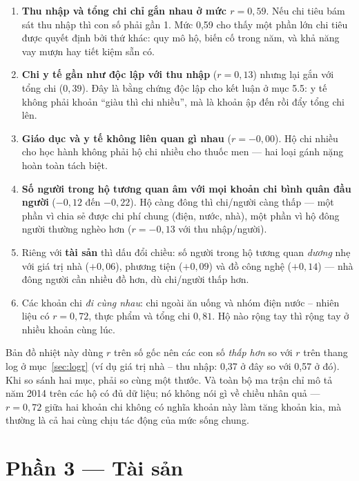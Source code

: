 \documentclass[11pt,a4paper]{article}
\newcommand{\n}[1]{\textbf{#1}}
\begin{document}
\begin{enumerate}[leftmargin=1.4em,itemsep=3pt,topsep=2pt]
\item \n{Thu nhập và tổng chi chỉ gắn nhau ở mức $r = 0{,}59$}. Nếu chi tiêu bám sát thu nhập thì con số phải gần 1. Mức 0,59 cho thấy một phần lớn chi tiêu được quyết định bởi thứ khác: quy mô hộ, biến cố trong năm, và khả năng vay mượn hay tiết kiệm sẵn có.
\item \n{Chi y tế gần như độc lập với thu nhập} ($r = 0{,}13$) nhưng lại gắn với tổng chi ($0{,}39$). Đây là bằng chứng độc lập cho kết luận ở mục 5.5: y tế không phải khoản “giàu thì chi nhiều”, mà là khoản ập đến rồi đẩy tổng chi lên.
\item \n{Giáo dục và y tế không liên quan gì nhau} ($r = -0{,}00$). Hộ chi nhiều cho học hành không phải hộ chi nhiều cho thuốc men — hai loại gánh nặng hoàn toàn tách biệt.
\item \n{Số người trong hộ tương quan âm với mọi khoản chi bình quân đầu người} ($-0{,}12$ đến $-0{,}22$). Hộ càng đông thì chi/người càng thấp — một phần vì chia sẻ được chi phí chung (điện, nước, nhà), một phần vì hộ đông người thường nghèo hơn ($r = -0{,}13$ với thu nhập/người).
\item Riêng với \n{tài sản} thì dấu đổi chiều: số người trong hộ tương quan \emph{dương} nhẹ với giá trị nhà ($+0{,}06$), phương tiện ($+0{,}09$) và đồ công nghệ ($+0{,}14$) — nhà đông người cần nhiều đồ hơn, dù chi/người thấp hơn.
\item Các khoản chi \emph{đi cùng nhau}: chi ngoài ăn uống và nhóm điện nước – nhiên liệu có $r = 0{,}72$, thực phẩm và tổng chi $0{,}81$. Hộ nào rộng tay thì rộng tay ở nhiều khoản cùng lúc.
\end{enumerate}

\begin{pp}
Bản đồ nhiệt này dùng $r$ trên số gốc nên các con số \emph{thấp hơn} so với $r$ trên thang log ở mục~\ref{sec:logr} (ví dụ giá trị nhà – thu nhập: 0,37 ở đây so với 0,57 ở đó). Khi so sánh hai mục, phải so cùng một thước. Và toàn bộ ma trận chỉ mô tả năm 2014 trên các hộ có đủ dữ liệu; nó không nói gì về chiều nhân quả — $r = 0{,}72$ giữa hai khoản chi không có nghĩa khoản này làm tăng khoản kia, mà thường là cả hai cùng chịu tác động của mức sống chung.
\end{pp}

\section{Phần 3 — Tài sản}
\end{document}
